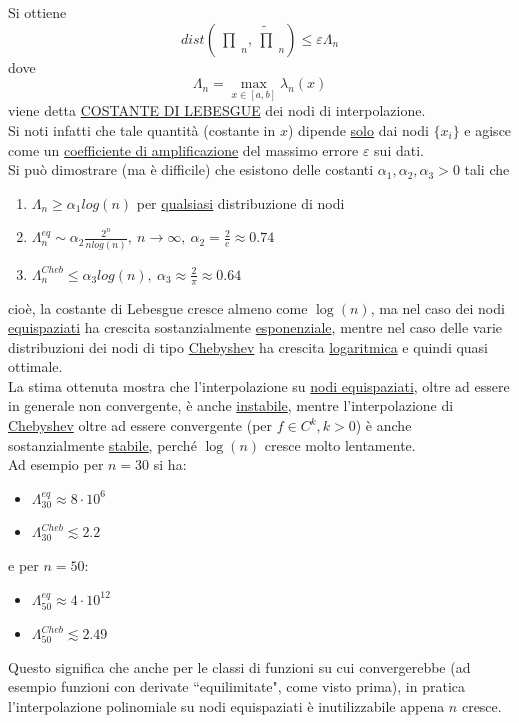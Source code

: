 \documentclass[12pt]{article}
\newcommand{\inter}{\begin{matrix}\prod\end{matrix}}
\begin{document}
Si ottiene
\[ dist\left(\inter_n,\tilde{\inter}_n\right)\leq \varepsilon\Lambda_n \]
dove 
\[\Lambda_n= \max_{x\in[a,b]}\lambda_n(x)\]
viene detta \uline{COSTANTE DI LEBESGUE} dei nodi di interpolazione.\\
Si noti infatti che tale quantità (costante in $x$) dipende \uline{solo} dai nodi $\{ x_i \}$ e agisce come un \uline{coefficiente di amplificazione} del massimo errore $\varepsilon$ sui dati.\\
Si può dimostrare (ma è difficile) che esistono delle costanti $\alpha_1, \alpha_2, \alpha_3 > 0$ tali che
\begin{enumerate}
    \item $\Lambda_n \geq \alpha_1 log(n)$ per \uline{qualsiasi} distribuzione di nodi
    \item $\Lambda^{eq}_n \sim \alpha_2 \frac{2^n}{nlog(n)}, \ n \to \infty, \ \alpha_2 = \frac{2}{e} \approx 0.74$
    \item $\Lambda^{Cheb}_n \leq \alpha_3 log(n), \ \alpha_3 \approx \frac{2}{\pi} \approx 0.64$
\end{enumerate}
cioè, la costante di Lebesgue cresce almeno come $\log(n)$, ma nel caso dei nodi \uline{equispaziati} ha crescita sostanzialmente \uline{esponenziale}, mentre nel caso delle varie distribuzioni dei nodi di tipo \uline{Chebyshev} ha crescita \uline{logaritmica} e quindi quasi ottimale.\\
La stima ottenuta mostra che l'interpolazione su \uline{nodi equispaziati}, oltre ad essere in generale non convergente, è anche \uline{instabile}, mentre l'interpolazione di \uline{Chebyshev} oltre ad essere convergente (per $f \in C^k, k>0$) è anche sostanzialmente \uline{stabile}, perché $\log(n)$ cresce molto lentamente.\\
Ad esempio per $n=30$ si ha:
\begin{itemize}
\item $\Lambda^{eq}_{30} \approx 8 \cdot 10^6$
\item $\Lambda^{Cheb}_{30} \lesssim 2.2$
\end{itemize}
e per $n=50$:
\begin{itemize}
\item $\Lambda^{eq}_{50} \approx 4 \cdot 10^{12}$
\item $\Lambda^{Cheb}_{50} \lesssim 2.49$
\end{itemize}
Questo significa che anche per le classi di funzioni su cui convergerebbe (ad esempio funzioni con derivate ``equilimitate", come visto prima), in pratica l'interpolazione polinomiale su nodi equispaziati è inutilizzabile appena $n$ cresce.\\
\end{document}
